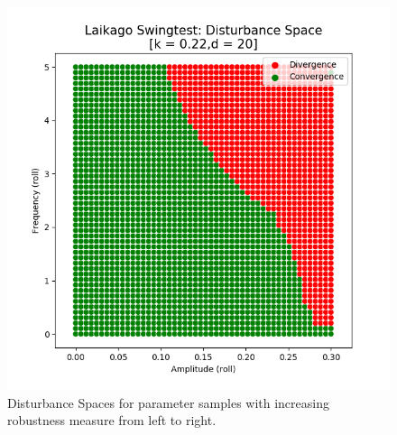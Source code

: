 \begin{figure}[h]
\begin{minipage}{0.33\textwidth}
        \end{minipage}
        \begin{minipage}{0.33\textwidth}
            \centering
            \includegraphics[width=\textwidth]{figures/swingtest_ds_opt_vfinal.png} %
        \end{minipage}

    \caption{Disturbance Spaces for parameter samples with increasing robustness measure from left to right.}
    \label{fig:swingds}
    \end{figure}

